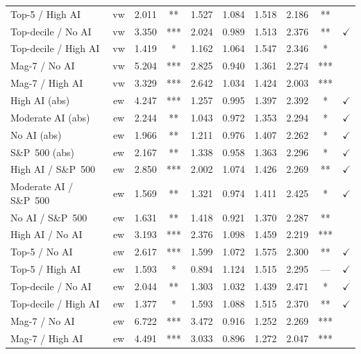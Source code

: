 \begin{table}[!htbp]
\begin{tabular}{l c S[table-format=1.3] c S[table-format=1.3] S[table-format=1.3] S[table-format=1.3] S[table-format=1.3] c c}
Top-5 / High AI            & vw & 2.011 & **  & 1.527 & 1.084 & 1.518 & 2.186 & **  & \\
Top-decile / No AI         & vw & 3.350 & *** & 2.024 & 0.989 & 1.513 & 2.376 & **  & $\checkmark$ \\
Top-decile / High AI       & vw & 1.419 & *   & 1.162 & 1.064 & 1.547 & 2.346 & *   & \\
Mag-7 / No AI              & vw & 5.204 & *** & 2.825 & 0.940 & 1.361 & 2.274 & *** & \\
Mag-7 / High AI            & vw & 3.329 & *** & 2.642 & 1.034 & 1.424 & 2.003 & *** & \\
\midrule
High AI (abs)              & ew & 4.247 & *** & 1.257 & 0.995 & 1.397 & 2.392 & *   & $\checkmark$ \\
Moderate AI (abs)          & ew & 2.244 & **  & 1.043 & 0.972 & 1.353 & 2.294 & *   & $\checkmark$ \\
No AI (abs)                & ew & 1.966 & **  & 1.211 & 0.976 & 1.407 & 2.262 & *   & $\checkmark$ \\
S\&P~500 (abs)             & ew & 2.167 & **  & 1.338 & 0.958 & 1.363 & 2.296 & *   & $\checkmark$ \\
High AI / S\&P~500         & ew & 2.850 & *** & 2.002 & 1.074 & 1.426 & 2.269 & **  & $\checkmark$ \\
Moderate AI / S\&P~500     & ew & 1.569 & **  & 1.321 & 0.974 & 1.411 & 2.425 & *   & $\checkmark$ \\
No AI / S\&P~500           & ew & 1.631 & **  & 1.418 & 0.921 & 1.370 & 2.287 & **  & \\
High AI / No AI            & ew & 3.193 & *** & 2.376 & 1.098 & 1.459 & 2.219 & *** & \\
Top-5 / No AI              & ew & 2.617 & *** & 1.599 & 1.072 & 1.575 & 2.300 & **  & $\checkmark$ \\
Top-5 / High AI            & ew & 1.593 & *   & 0.894 & 1.124 & 1.515 & 2.295 & --- & $\checkmark$ \\
Top-decile / No AI         & ew & 2.044 & **  & 1.303 & 1.032 & 1.439 & 2.471 & *   & $\checkmark$ \\
Top-decile / High AI       & ew & 1.377 & *   & 1.593 & 1.088 & 1.515 & 2.370 & **  & $\checkmark$ \\
Mag-7 / No AI              & ew & 6.722 & *** & 3.472 & 0.916 & 1.252 & 2.269 & *** & \\
Mag-7 / High AI            & ew & 4.491 & *** & 3.033 & 0.896 & 1.272 & 2.047 & *** & \\

\end{tabular}
\end{table}

